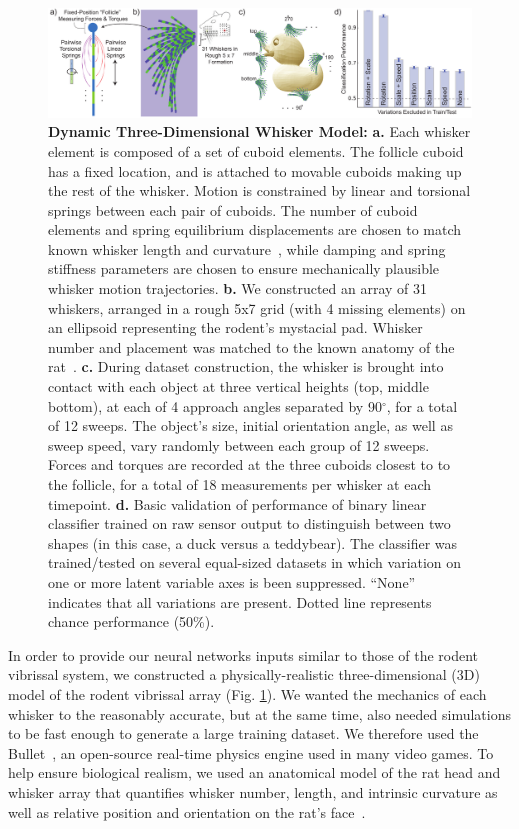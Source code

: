 \begin{figure}
\centering
\includegraphics [width=1\linewidth]{figures/whiskers.pdf}
\vspace{-2mm}
\caption{\textbf{Dynamic Three-Dimensional Whisker Model:} \textbf{a.} Each whisker element is composed of a set of cuboid elements. 
The follicle cuboid has a fixed location, and is attached to movable cuboids making up the rest of the whisker. 
Motion is constrained by linear and torsional springs between each pair of cuboids. 
The number of cuboid elements and spring equilibrium displacements are chosen to match known whisker length and curvature~\cite{Towal2011}, while damping and spring stiffness parameters are chosen to ensure mechanically plausible whisker motion trajectories.  
\textbf{b.} We constructed an array of 31 whiskers, arranged in a rough 5x7 grid (with 4 missing elements) on an ellipsoid representing the rodent's mystacial pad.  Whisker number and placement was matched to the known anatomy of the rat~\cite{Towal2011}.
\textbf{c.} During dataset construction, the whisker is brought into contact with each object at three vertical heights (top, middle bottom), at each of 4 approach angles separated by 90$^{\circ}$, for a total of 12 sweeps.  
The object's size, initial orientation angle, as well as sweep speed, vary randomly between each group of 12 sweeps. 
Forces and torques are recorded at the three cuboids closest to to the follicle, for a total of 18 measurements per whisker at each timepoint. 
\textbf{d.} Basic validation of performance of binary linear classifier trained on raw sensor output to distinguish between two shapes (in this case, a duck versus a teddybear).  The classifier was trained/tested on several equal-sized datasets in which variation on one or more latent variable axes is been suppressed. ``None'' indicates that all variations are present.  Dotted line represents chance performance (50\%).~\label{fig_whiskers}}
\end{figure}

In order to provide our neural networks inputs similar to those of the rodent vibrissal system, we constructed a physically-realistic three-dimensional (3D) model of the rodent vibrissal array (Fig. \ref{fig_whiskers}).  
We wanted the mechanics of each whisker to the reasonably accurate, but at the same time, also needed simulations to be fast enough to generate a large training dataset.   
We therefore used the Bullet~\cite{wiki:bullet}, an open-source real-time physics engine used in many video games. 
To help ensure biological realism, we used an anatomical model of the rat head and whisker array that quantifies whisker number, length, and intrinsic curvature as well as relative position and orientation on the rat's face~\cite{Towal2011}.

